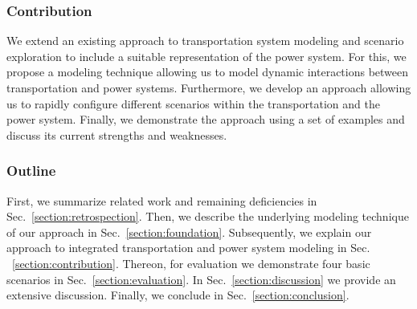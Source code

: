 \subsubsection*{Contribution}

We extend an existing approach to transportation system modeling and scenario exploration to include a suitable representation of the power system. For this, we propose a modeling technique allowing us to model dynamic interactions between transportation and power systems. Furthermore, we develop an approach allowing us to rapidly configure different scenarios within the transportation and the power system. Finally, we demonstrate the approach using a set of examples and discuss its current strengths and weaknesses.

\subsubsection*{Outline}

First, we summarize related work and remaining deficiencies in Sec.~\ref{section:retrospection}. Then, we describe the underlying modeling technique of our approach in Sec.~\ref{section:foundation}. Subsequently, we explain our approach to integrated transportation and power system modeling in Sec. ~\ref{section:contribution}. Thereon, for evaluation we demonstrate four basic scenarios in Sec.~\ref{section:evaluation}. In Sec.~\ref{section:discussion} we provide an extensive discussion. Finally, we conclude in Sec.~\ref{section:conclusion}.